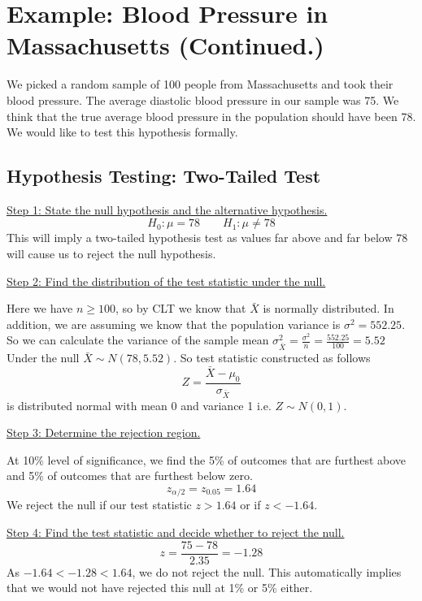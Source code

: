 \documentclass{./../../Latex/handout}
\begin{document}
\thispagestyle{plain}
\newcommand{\mytitle}{Hypothesis Testing: Example}
\myheader{\mytitle}

\vspace{-1cm}
\section*{Example: Blood Pressure in Massachusetts (Continued.)}

We picked a random sample of 100 people from Massachusetts and took their blood pressure. The average diastolic blood pressure in our sample was 75. We think that the true average blood pressure in the population should have been 78. We would like to test this hypothesis formally. 

\subsection*{Hypothesis Testing: Two-Tailed Test} 

\underline{Step 1: State the null hypothesis and the alternative hypothesis.}
$$ H_0: \mu = 78 \quad \quad H_1: \mu \neq 78 $$
This will imply a two-tailed hypothesis test as values far above and far below 78 will cause us to reject the null hypothesis. 

\underline{Step 2:  Find the distribution of the test statistic under the null.} 

Here we have $n \geq 100$, so by CLT we know that $ \bar{X}$ is normally distributed. In addition, we are assuming we know that the population variance is $\sigma^2 = 552.25$. So we can calculate the variance of the sample mean $ \sigma^2_{\bar{X}} = \frac{\sigma^2}{n}= \frac{552.25}{100} = 5.52$ Under the null $ \bar{X} \sim N(78, 5.52) $. So test statistic constructed as follows
$$ Z = \frac{\bar{X}-\mu_0}{\sigma_{\bar{X}}} $$ 
is distributed normal with mean 0 and variance 1 i.e. $Z \sim N(0,1)$. 

\underline{Step 3: Determine the rejection region.}   

At 10\% level of significance, we find the 5\% of outcomes that are furthest above and 5\% of outcomes that are furthest below zero. 
$$ z_{\alpha/2} = z_{0.05} = 1.64 $$
We reject the null if our test statistic $z>1.64$ or if $z<-1.64$. 

\underline{Step 4: Find the test statistic and decide whether to reject the null.} \\
$$ z = \frac{75-78}{2.35} = -1.28 $$ 
As $-1.64 < -1.28 < 1.64$, we do not reject the null. This automatically implies that we would not have rejected this null at 1\% or 5\% either. 
\end{document}
